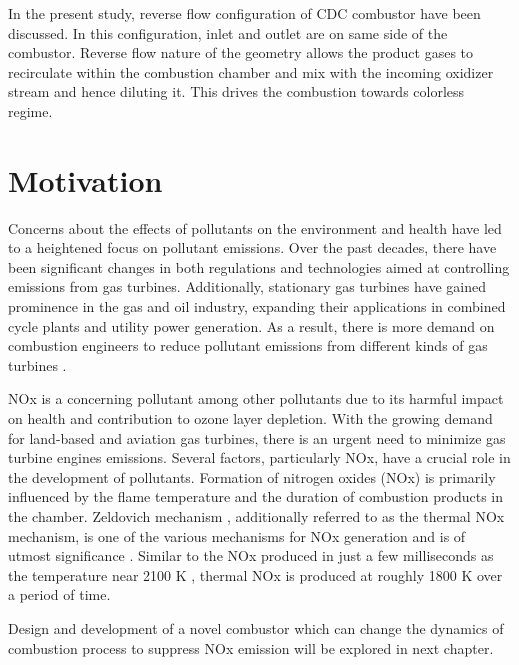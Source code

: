 In the present study, reverse flow configuration of CDC combustor have been discussed. In this configuration, inlet and outlet are on same side of the combustor. Reverse flow nature of the geometry allows the product gases to recirculate within the combustion chamber and mix with the incoming oxidizer stream and hence diluting it. This drives the combustion towards colorless regime.

\section{Motivation}
Concerns about the effects of pollutants on the environment and health have led to a heightened focus on pollutant emissions. Over the past decades, there have been significant changes in both regulations and technologies aimed at controlling emissions from gas turbines. Additionally, stationary gas turbines have gained prominence in the gas and oil industry, expanding their applications in combined cycle plants and utility power generation. As a result, there is more demand on combustion engineers to reduce pollutant emissions from different kinds of gas turbines \cite{Lefebvre2009}.

NOx is a concerning pollutant among other pollutants due to its harmful impact on health and contribution to ozone layer depletion. With the growing demand for land-based and aviation gas turbines, there is an urgent need to minimize gas turbine engines emissions. Several factors, particularly NOx, have a crucial role in the development of pollutants. Formation of nitrogen oxides (NOx) is primarily influenced by the flame temperature and the duration of combustion products in the chamber. Zeldovich mechanism \cite{LTY2013}, additionally referred to as the thermal NOx mechanism, is one of the various mechanisms for NOx generation and is of utmost significance \cite{LAH2010}. Similar to the NOx produced in just a few milliseconds as the temperature near 2100 K \cite{10.1115/1.4043437}, thermal NOx is produced at roughly 1800 K over a period of time.

Design and development of a novel combustor which can change the dynamics of combustion process to suppress NOx emission will be explored in next chapter.

